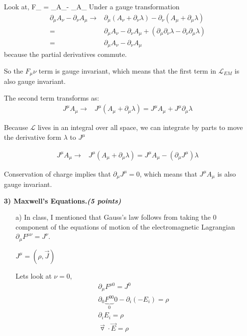 {Look at,
\be
F_{\mu\nu} = \partial_\mu A_\nu - \partial_\nu A_\mu
\ee
Under a gauge transformation
\begin{eqnarray*}
\partial_\mu A_\nu - \partial_\nu A_\mu \rightarrow& \partial_\mu (A_\nu + \partial_\nu \lambda) - \partial_\nu (A_\mu + \partial_\mu \lambda)\\
                                        =& \partial_\mu A_\nu - \partial_\nu A_\mu  + (\partial_\mu \partial_\nu \lambda - \partial_\nu \partial_\mu \lambda)\\
                                        =& \partial_\mu A_\nu - \partial_\nu A_\mu  
\end{eqnarray*}
because the partial derivatives commute.

So the $F_\mu\nu$ term is gauge invariant, which means that the first term in $\mathscr{L}_{EM}$ is also gauge invariant.

The second term transforms as:
\begin{eqnarray*}
J^\mu A_\mu \rightarrow& J^\mu(A_\mu + \partial_\mu \lambda) = J^\mu A_\mu + J^\mu  \partial_\mu \lambda
\end{eqnarray*}

Because $\mathscr{L}$ lives in an integral over all space, we can integrate by parts to move the derivative form $\lambda$ to $J^\mu$

\begin{eqnarray*}
J^\mu A_\mu \rightarrow& J^\mu(A_\mu + \partial_\mu \lambda) = J^\mu A_\mu - (\partial_\mu J^\mu)\lambda
\end{eqnarray*}

Conservation of charge implies that $\partial_\mu J^\mu = 0$, which means that $J^\mu A_\mu$ is also gauge invariant.


\vspace*{0.25in}




\textbf{3) Maxwell’s Equations.\hfill \textit{(5 points)}}
\begin{itemize}
\item[a)]In class,  I mentioned  that Gauss’s law follows from taking the 0 component of the equations of motion of the electromagnetic Lagrangian $\partial_\mu F^{\mu\nu} = J^\nu$. 

$J^\mu = (\rho, \vec{J})$

Lets look at $\nu = 0$,
\begin{align}
\partial_\mu F^{\mu0} = J^0 \\
\partial_0 \underbrace{F^{00}}_{0} 0 - \partial_i (-E_i) = \rho \\
\partial_i E_i = \rho \\
\vec{\triangledown} \cdot \vec{E} = \rho \\
\end{align}





\end{itemize}}
